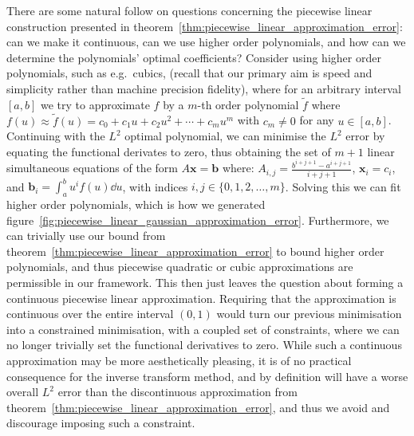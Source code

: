 \documentclass[manuscript,review]{acmart}
\begin{document}
There are some natural follow on questions concerning the piecewise linear construction presented in theorem~\ref{thm:piecewise_linear_approximation_error}: can we make it continuous, can we use higher order polynomials, and how can we determine the polynomials' optimal coefficients? Consider using higher order polynomials, such as e.g.\ cubics, (recall that our primary aim is speed and simplicity rather than machine precision fidelity), where for an arbitrary interval $ [a,b] $ we try to approximate $ f $ by a $ m $-th order polynomial $ \tilde{f} $ where $ f(u) \approx \tilde{f}(u) = c_0 + c_1 u + c_2 u^2 + \cdots + c_m u^m $ with $ c_m \neq 0 $ for any $ u \in [a,b] $. Continuing with the $ L^2 $ optimal polynomial, we can minimise the $ L^2 $ error by equating the functional derivates to zero, thus obtaining the set of $ m + 1 $ linear simultaneous equations of the form $ A\bm{x} = \bm{b} $ where: $ A_{i,j} = \tfrac{b^{i+j+1} - a^{i+j+1}}{i+j+1} $, $ \bm{x}_i = c_i $, and $ \bm{b}_{i} = \int_{a}^{b} u^i f(u) \dd{u} $, with indices $ i,j \in \{0,1,2,\ldots,m\} $. Solving this we can fit higher order polynomials, which is how we generated figure~\ref{fig:piecewise_linear_gaussian_approximation_error}. Furthermore, we can trivially use our bound from theorem~\ref{thm:piecewise_linear_approximation_error} to bound higher order polynomials, and thus piecewise quadratic or cubic approximations are permissible in our framework. This then just leaves the question about forming a continuous piecewise linear approximation. Requiring that the approximation is continuous over the entire interval $ (0, 1) $ would turn our previous minimisation into a constrained minimisation, with a coupled set of constraints, where we can no longer trivially set the functional derivatives to zero.  While such a continuous approximation may be more aesthetically pleasing, it is of no practical consequence for the inverse transform method, and by definition will have a worse overall $ L^2 $ error than the discontinuous approximation from theorem~\ref{thm:piecewise_linear_approximation_error}, and thus we avoid and discourage imposing such a constraint. 
\end{document}
